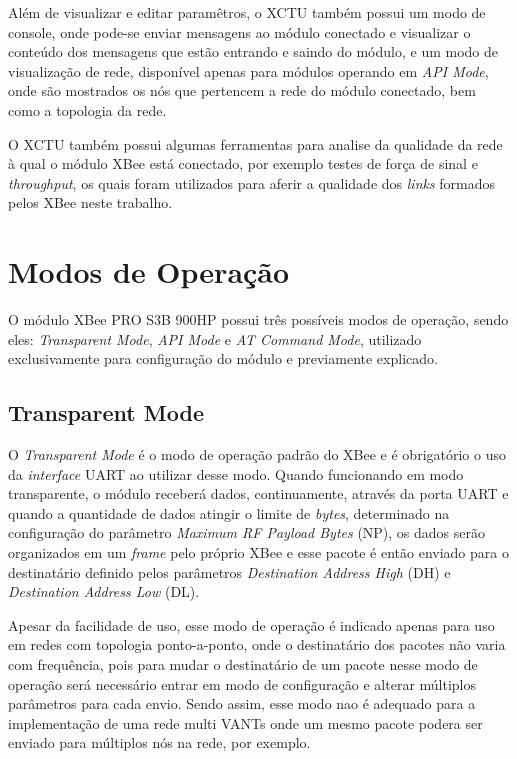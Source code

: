 Além de visualizar e editar paramêtros, o XCTU também possui um modo de console, onde pode-se enviar mensagens ao módulo conectado e visualizar o conteúdo dos mensagens que estão entrando e saindo do módulo, e um modo de visualização de rede, disponível apenas para módulos operando em \emph{API Mode}, onde são mostrados os nós que pertencem a rede do módulo conectado, bem como a topologia da rede.

O XCTU também possui algumas ferramentas para analise da qualidade da rede à qual o módulo XBee está conectado, por exemplo testes de força de sinal e \emph{throughput}, os quais foram utilizados para aferir a qualidade dos \emph{links} formados pelos XBee neste trabalho.

\section{Modos de Operação}

O módulo XBee PRO S3B 900HP possui três possíveis modos de operação, sendo eles: \emph{Transparent Mode}, \emph{API Mode} e \emph{AT Command Mode}, utilizado exclusivamente para configuração do módulo e previamente explicado.

\subsection{Transparent Mode}

O \emph{Transparent Mode} é o modo de operação padrão do XBee e é obrigatório o uso da \emph{interface} UART ao utilizar desse modo. Quando funcionando em modo transparente, o módulo receberá dados, continuamente, através da porta UART e quando a quantidade de dados atingir o limite de \emph{bytes}, determinado na configuração do parâmetro \emph{Maximum RF Payload Bytes} (NP), os dados serão organizados em um \emph{frame} pelo próprio XBee e esse pacote é então enviado para o destinatário definido pelos parâmetros \emph{Destination Address High} (DH) e \emph{Destination Address Low} (DL). 

Apesar da facilidade de uso, esse modo de operação é indicado apenas para uso em redes com topologia ponto-a-ponto, onde o destinatário dos pacotes não varia com frequência, pois para mudar o destinatário de um pacote nesse modo de operação será necessário entrar em modo de configuração e alterar múltiplos parâmetros para cada envio. Sendo assim, esse modo nao é adequado para a implementação de uma rede multi VANTs onde um mesmo pacote podera ser enviado para múltiplos nós na rede, por exemplo.

